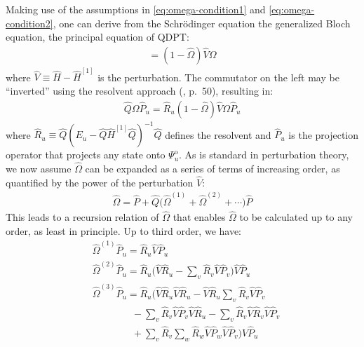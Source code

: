Making use of the assumptions in  \eqref{eq:omega-condition1} and \eqref{eq:omega-condition2}, one can derive from the Schr\"odinger equation the generalized Bloch equation, the principal equation of QDPT:
\begin{gather*}
  [\hat \Omega, \hat{H}^{[1]}] =
  (1 - \hat \Omega) \hat V \Omega
\end{gather*}
where $\hat V \equiv \hat H - \hat{H}^{[1]}$ is the perturbation.  The
commutator on the left may be ``inverted'' using the resolvent approach
(\cite{shavitt2009many}, p.\ 50), resulting in:
\begin{align*}
  \hat Q \Omega \hat P_u =
  \hat R_u (1 - \hat \Omega) \hat V \Omega \hat P_u
\end{align*}
where $\hat R_u \equiv \hat Q (E_u - \hat Q \hat{H}^{[1]} \hat Q)^{-1} \hat Q$ defines the resolvent and $\hat P_u$ is the projection operator that projects any state onto $\Psi^{\mathrm{o}}_u$.  As is standard in perturbation theory, we now assume $\hat \Omega$ can be expanded as a series of terms of increasing order, as quantified by the power of the perturbation $\hat V$:
\begin{align*}
  \hat \Omega = \hat P +
  \hat Q\bigl(\hat \Omega^{(1)} + \hat \Omega^{(2)} + \cdots\bigr) \hat P
\end{align*}
This leads to a recursion relation of $\hat \Omega$ that enables $\hat \Omega$ to be calculated up to any order, as least in principle.  Up to third order, we have:
\begin{align*}
  &\hat \Omega^{(1)} \hat P_u = \hat R_u \hat V \hat P_u \\
  &\hat \Omega^{(2)} \hat P_u =
    \hat R_u \biggl(
    \hat V \hat R_u
    - \sum_v \hat R_v \hat V \hat P_v
    \biggr) \hat V \hat P_u \\
  &\hat \Omega^{(3)} \hat P_u =
    \hat R_u \biggl(
    \hat V \hat R_u \hat V \hat R_u
    - \hat V \hat R_u \sum_v \hat R_v \hat V \hat P_v \\
  &\qquad\qquad
    - \sum_v \hat R_v \hat V \hat P_v \hat V \hat R_u
    - \sum_v \hat R_v \hat V \hat R_v \hat V \hat P_v \\
  &\qquad\qquad
    + \sum_v \hat R_v \sum_w \hat R_w \hat V \hat P_w \hat V \hat P_v
    \biggr) \hat V \hat P_u
\end{align*}

